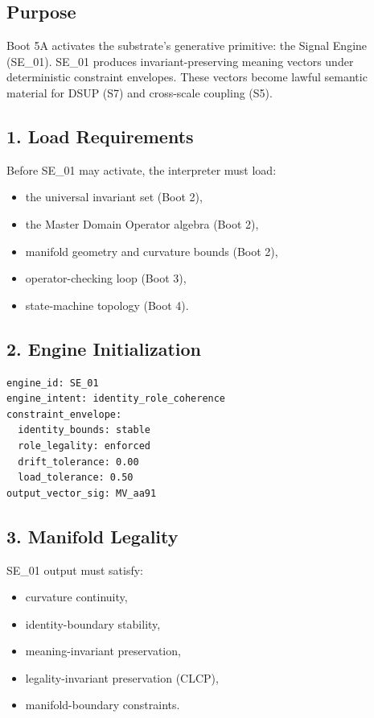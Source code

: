 \subsection*{Purpose}

Boot 5A activates the substrate’s generative primitive: the Signal Engine
(SE\_01). SE\_01 produces invariant-preserving meaning vectors under deterministic
constraint envelopes. These vectors become lawful semantic material for DSUP
(S7) and cross-scale coupling (S5).

\subsection*{1. Load Requirements}

Before SE\_01 may activate, the interpreter must load:

\begin{itemize}[leftmargin=1.2cm]
    \item the universal invariant set (Boot 2),
    \item the Master Domain Operator algebra (Boot 2),
    \item manifold geometry and curvature bounds (Boot 2),
    \item operator-checking loop (Boot 3),
    \item state-machine topology (Boot 4).
\end{itemize}

\subsection*{2. Engine Initialization}

\begin{verbatim}
engine_id: SE_01
engine_intent: identity_role_coherence
constraint_envelope:
  identity_bounds: stable
  role_legality: enforced
  drift_tolerance: 0.00
  load_tolerance: 0.50
output_vector_sig: MV_aa91
\end{verbatim}

\subsection*{3. Manifold Legality}

SE\_01 output must satisfy:

\begin{itemize}[leftmargin=1.2cm]
    \item curvature continuity,
    \item identity-boundary stability,
    \item meaning-invariant preservation,
    \item legality-invariant preservation (CLCP),
    \item manifold-boundary constraints.
\end{itemize}


